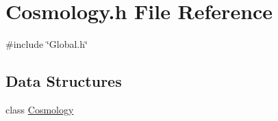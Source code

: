 \section{Cosmology.h File Reference}
\label{Cosmology_8h}
{\ttfamily \#include \char`\"{}Global.h\char`\"{}}\par
\subsection*{Data Structures}
\begin{DoxyCompactItemize}
\item 
class \hyperlink{classCosmology}{Cosmology}
\end{DoxyCompactItemize}
